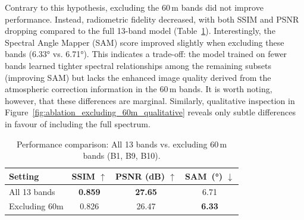 \documentclass[remotesensing,article,submit,pdftex,moreauthors]{Definitions/mdpi}
\begin{document}
Contrary to this hypothesis, excluding the 60\,m bands did not improve performance. Instead, radiometric fidelity decreased, with both SSIM and PSNR dropping compared to the full 13-band model (Table~\ref{tab:ablation_excluding_60m}). Interestingly, the Spectral Angle Mapper (SAM) score improved slightly when excluding these bands (6.33° vs. 6.71°). This indicates a trade-off: the model trained on fewer bands learned tighter spectral relationships among the remaining subsets (improving SAM) but lacks the enhanced image quality derived from the atmospheric correction information in the 60\,m bands. It is worth noting, however, that these differences are marginal. Similarly, qualitative inspection in Figure~\ref{fig:ablation_excluding_60m_qualitative} reveals only subtle differences in favour of including the full spectrum.

\begin{table}[!htbp]
    \centering
    \caption{Performance comparison: All 13 bands vs. excluding 60\,m bands (B1, B9, B10).}
    \label{tab:ablation_excluding_60m}
    \begin{tabular}{lccc}
        \toprule
        \textbf{Setting} & \textbf{SSIM $\uparrow$} & \textbf{PSNR (dB) $\uparrow$} & \textbf{SAM~(°) $\downarrow$} \\
        \midrule
        All 13 bands & \textbf{0.859} & \textbf{27.65} & 6.71 \\
        Excluding 60m & 0.826 & 26.47 & \textbf{6.33} \\
        \bottomrule
    \end{tabular}
\end{table}
\end{document}
